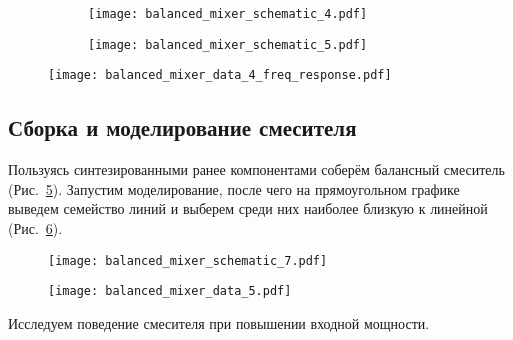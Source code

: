 \begin{figure}[!ht]
    \centering
    \begin{subfigure}[b]{0.45\textwidth}
        \centering
        \texttt{[image: balanced\_mixer\_schematic\_4.pdf]}
        \caption{}%
        \label{fig:balanced_mixer_schematic_4}
    \end{subfigure}
    \hfill
    \begin{subfigure}[b]{0.45\textwidth}
        \centering
        \texttt{[image: balanced\_mixer\_schematic\_5.pdf]}
        \caption{}%
        \label{fig:balanced_mixer_schematic_5}
    \end{subfigure}
\end{figure}

\begin{figure}[!ht]
    \centering
    \texttt{[image: balanced\_mixer\_data\_4\_freq\_response.pdf]}
    \caption{}%
    \label{fig:balanced_mixer_data_4_freq_response}
\end{figure}

\subsection{Сборка и моделирование смесителя}

Пользуясь синтезированными ранее компонентами соберём балансный смеситель (Рис.~\ref{fig:balanced_mixer_schematic_7}).
Запустим моделирование, после чего на прямоугольном графике выведем семейство линий и выберем среди них наиболее близкую к линейной (Рис.~\ref{fig:balanced_mixer_data_5}).

\begin{figure}[!ht]
    \centering
    \texttt{[image: balanced\_mixer\_schematic\_7.pdf]}
    \caption{}%
    \label{fig:balanced_mixer_schematic_7}
\end{figure}

\begin{figure}[!ht]
    \centering
    \texttt{[image: balanced\_mixer\_data\_5.pdf]}
    \caption{}%
    \label{fig:balanced_mixer_data_5}
\end{figure}

Исследуем поведение смесителя при повышении входной мощности.

